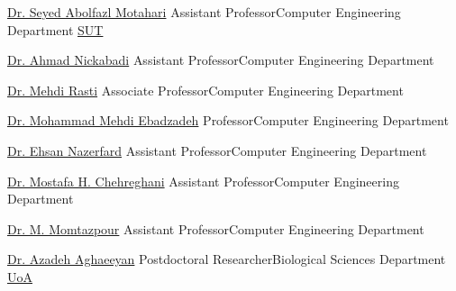 
\newcommand{\cesuffix}{{\enskip\cdotp\enskip}Computer Engineering Department}

\begin{cvhonors}

  \cvref
    {\href{https://scholar.google.com/citations?user=rJ-biB0AAAAJ&hl=en}{Dr. Seyed Abolfazl Motahari}} %
    {Assistant Professor\cesuffix} %
    {\href{https://www.sharif.edu}{SUT}} %

  \cvref
    {\href{https://scholar.google.com/citations?user=pSMNSZwAAAAJ&hl=en}{Dr. Ahmad Nickabadi}} %
    {Assistant Professor\cesuffix} %
    {} %

  \cvref
    {\href{https://scholar.google.com/citations?user=zb8pjMYAAAAJ&hl=en}{Dr. Mehdi Rasti}} %
    {Associate Professor\cesuffix} %
    {} %

  \cvref
    {\href{https://scholar.google.com/citations?user=080Y\_lUAAAAJ&hl=en}{Dr. Mohammad Mehdi Ebadzadeh}} %
    {Professor\cesuffix} %
    {} %

  \cvref
    {\href{https://scholar.google.com/citations?user=Cl5tre8AAAAJ&hl=en}{Dr. Ehsan Nazerfard}} %
    {Assistant Professor\cesuffix} %
    {} %

  \cvref
    {\href{https://scholar.google.com/citations?user=8Hhu1Q8AAAAJ&hl=en}{Dr. Mostafa H. Chehreghani}} %
    {Assistant Professor\cesuffix} %
    {} %

  \cvref
    {\href{https://scholar.google.com/citations?user=uwozfWkAAAAJ&hl=en}{Dr. M. Momtazpour}} %
    {Assistant Professor\cesuffix} %
    {} %

  \cvref
    {\href{https://grad.biology.ualberta.ca/mlewis/azadeh-aghaeeyan/}{Dr. Azadeh Aghaeeyan}} %
    {Postdoctoral Researcher{\enskip\cdotp\enskip}Biological Sciences Department} %
    {\href{https://www.ualberta.ca/index.html}{UoA}} %


\end{cvhonors}
